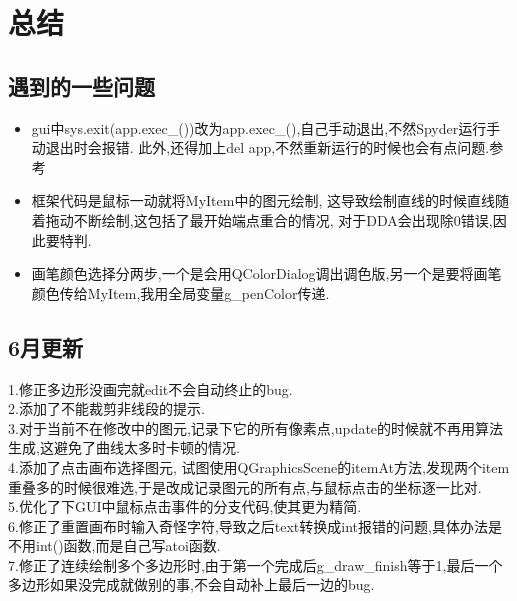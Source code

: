 \documentclass[a4paper,UTF8]{article}
\theoremstyle{definition}
\begin{document}
\section{总结}
\subsection{遇到的一些问题}
\begin{itemize}
	\item gui中sys.exit(app.exec\_())改为app.exec\_(),自己手动退出,不然Spyder运行手动退出时会报错.
	此外,还得加上del app,不然重新运行的时候也会有点问题.参考\cite{exit}
	
	\item 框架代码是鼠标一动就将MyItem中的图元绘制,
	这导致绘制直线的时候直线随着拖动不断绘制,这包括了最开始端点重合的情况,
	对于DDA会出现除0错误,因此要特判.
	
	\item 画笔颜色选择分两步,一个是会用QColorDialog调出调色版,另一个是要将画笔颜色传给MyItem,我用全局变量g\_penColor传递.
\end{itemize}
\subsection{6月更新}
1.修正多边形没画完就edit不会自动终止的bug.\\
2.添加了不能裁剪非线段的提示.\\
3.对于当前不在修改中的图元,记录下它的所有像素点,update的时候就不再用算法生成,这避免了曲线太多时卡顿的情况.\\
4.添加了点击画布选择图元, 试图使用QGraphicsScene的itemAt方法,发现两个item重叠多的时候很难选,于是改成记录图元的所有点,与鼠标点击的坐标逐一比对.\\
5.优化了下GUI中鼠标点击事件的分支代码,使其更为精简.\\
6.修正了重置画布时输入奇怪字符,导致之后text转换成int报错的问题,具体办法是不用int()函数,而是自己写atoi函数.\\
7.修正了连续绘制多个多边形时,由于第一个完成后g\_draw\_finish等于1,最后一个多边形如果没完成就做别的事,不会自动补上最后一边的bug.\\

%

\end{document}

